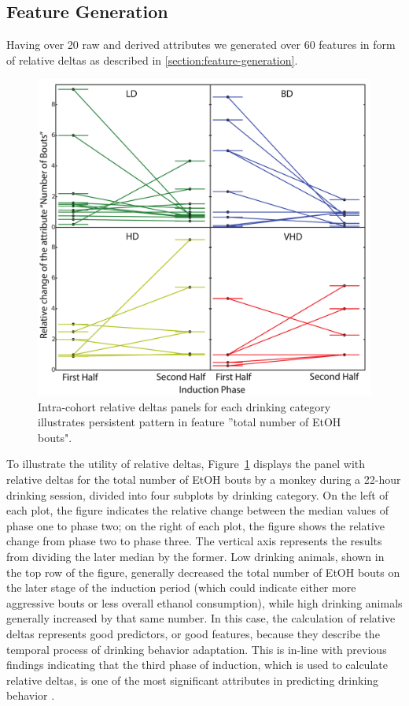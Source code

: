 	\subsection{Feature Generation}	
	Having over 20 raw and derived attributes we generated over 60 features in form of relative deltas as described in \cref{section:feature-generation}.
	\begin{figure}[ht]
		\centering
		\includegraphics[width=0.8\linewidth]{figures/rel_change_num_bouts.pdf}
		\caption{Intra-cohort relative deltas panels for each drinking category illustrates persistent pattern in feature ''total number of EtOH bouts".}
		\label{fig:rel-change-bouts}	
	\end{figure}
	
	To illustrate the utility of relative deltas, Figure~\ref{fig:rel-change-bouts} displays the panel with relative deltas for the total number of EtOH bouts by a monkey during a 22-hour drinking session, divided into four subplots by drinking category. On the left of each plot, the figure indicates the relative change between the median values of phase one to phase two; on the right of each plot, the figure shows the relative change from phase two to phase three. The vertical axis represents the results from dividing the later median by the former. Low drinking animals, shown in the top row of the figure, generally decreased the total number of EtOH bouts on the later stage of the induction period (which could indicate either more aggressive bouts or less overall ethanol consumption), while high drinking animals generally increased by that same number. In this case, the calculation of relative deltas represents good predictors, or good features, because they describe the temporal process of drinking behavior adaptation. This is in-line with previous findings indicating that the third phase of induction, which is used to calculate relative deltas, is one of the most significant attributes in predicting drinking behavior .
	
